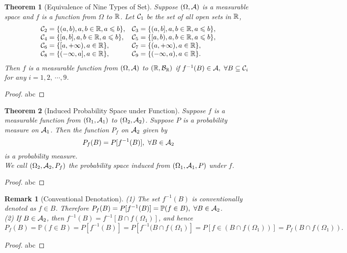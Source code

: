 \documentclass[openany,12pt]{book}
\newtheorem{theorem}{Theorem}[chapter]
\newtheorem{remark}{Remark}[chapter]
\begin{document}
\begin{theorem}[Equivalence of Nine Types of Set]
Suppose $(\Omega,\mathcal{A})$ is a measurable space and $f$ is a function from $\Omega$ to $\mathbb{R}$. Let $\mathcal{C}_1$ be the set of all open sets in $\mathbb{R}$, 
$$
\begin{array}{ll}
\mathcal{C}_2=\{(a,b),a,b\in\mathbb{R},a\leqslant b\},    &\mathcal{C}_3=\{(a,b],a,b\in\mathbb{R},a\leqslant b\},\\
\mathcal{C}_4=\{[a,b],a,b\in\mathbb{R},a\leqslant b\},     &\mathcal{C}_5=\{[a,b),a,b\in\mathbb{R},a\leqslant b\},\\
\mathcal{C}_6=\{[a,+\infty),a\in\mathbb{R}\},        &\mathcal{C}_7=\{(a,+\infty),a\in\mathbb{R}\},\\
\mathcal{C}_8=\{(-\infty,a],a\in\mathbb{R}\},        &\mathcal{C}_9=\{(-\infty,a),a\in\mathbb{R}\}.\\
\end{array}
$$
Then $f$ is a measurable function from $(\Omega,\mathcal{A})$ to $(\mathbb{R},\mathcal{B}_{\mathbb{R}})$
if $f^{-1} (B)\in\mathcal{A},\ \forall B\subseteq\mathcal{C}_i$ for any $i=1,2,\ \cdots,9$.
\end{theorem}

\begin{proof}
  abc
\end{proof}

\begin{theorem}[Induced Probability Space under Function]
Suppose $f$ is a measurable function from $(\Omega_1,\mathcal{A}_1)$ to $(\Omega_2,\mathcal{A}_2)$. Suppose $P$ is a probability measure on $\mathcal{A}_1$.
Then the function $P_f$ on $\mathcal{A}_2$ given by $$P_f (B)=P[f^{-1} (B)],\  \forall B\in\mathcal{A}_2$$ is a probability measure.\\
We call $(\Omega_2,\mathcal{A}_2,P_f)$ the probability space induced from $(\Omega_1,\mathcal{A}_1,P)$ under $f$.
\end{theorem}

\begin{proof}
  abc
\end{proof}

\begin{remark}[Conventional Denotation]
(1) The set $f^{-1} (B)$ is conventionally denoted as $f\in B$. Therefore $P_f (B)=P[f^{-1} (B)]=\mathbb{P}(f\in B),\ \forall B\in\mathcal{A}_2$.\\
(2) If $B\in\mathcal{A}_2$, then $f^{-1} (B)=f^{-1}[B\cap f(\Omega_1)]$, and hence
$P_f (B)=\mathbb{P}(f\in B)=P[f^{-1} (B)]=P[f^{-1} (B\cap f(\Omega_1)]=P[ f\in (B\cap f(\Omega_1))]=P_f (B\cap f(\Omega_1)).$
\end{remark}

\begin{proof}
  abc
\end{proof}
\end{document}
